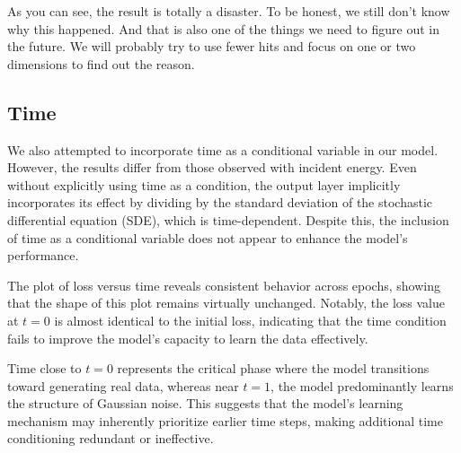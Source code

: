 As you can see, the result is totally a disaster. To be honest, we still don't know why this happened. And that is also one of the things we need to figure out in the future. We will probably try to use fewer hits and focus on one or two dimensions to find out the reason.






\subsection{Time}

We also attempted to incorporate time as a conditional variable in our model. However, the results differ from those observed with incident energy. Even without explicitly using time as a condition, the output layer implicitly incorporates its effect by dividing by the standard deviation of the stochastic differential equation (SDE), which is time-dependent. Despite this, the inclusion of time as a conditional variable does not appear to enhance the model's performance.

The plot of loss versus time reveals consistent behavior across epochs, showing that the shape of this plot remains virtually unchanged. Notably, the loss value at $t = 0$ is almost identical to the initial loss, indicating that the time condition fails to improve the model's capacity to learn the data effectively.

Time close to $t = 0$ represents the critical phase where the model transitions toward generating real data, whereas near $t = 1$, the model predominantly learns the structure of Gaussian noise. This suggests that the model's learning mechanism may inherently prioritize earlier time steps, making additional time conditioning redundant or ineffective.

